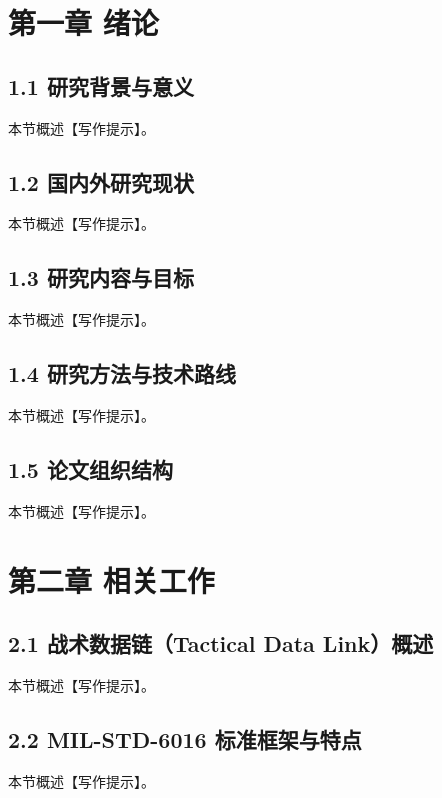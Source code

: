 
\chapter{第一章 绪论}
\section{1.1 研究背景与意义}
本节概述【写作提示】。\cite{NDIA_PMW101_2024,NDIA_PMW101_2022,DOTE_2022_MIDS_LVT,NAVAIR_MIDS_Overview,AviationWeek_SDA_LEO_2024,SDA_testing_OK_2023,MIL_STD_6016_Active_2024,L3Harris_MIDS_JTRS_2021}
\section{1.2 国内外研究现状}
本节概述【写作提示】。\cite{丁丁2019,马建强2020,程方昊2025,陈利玲2025,潘政昂2024,云超2025,wray_sheppard_1986_jtids_nav,ranger1996_jn,fried1978_taes,fried1984_navigation,doherty1988_jn,L3Harris_MIDS_LVT_2025}
\section{1.3 研究内容与目标}
本节概述【写作提示】。\cite{MITRE_Link16_Interoperability_2024,MIL_STD_6020_2017,MIL_STD_3011_2022,Collins_TTR_2021}
\section{1.4 研究方法与技术路线}
本节概述【写作提示】。\cite{SISO_STD_002_2006,CJCSI_6610_01F_2021,CJCSI_6610_01F_archive_2014,garciapena2021_navigation,musumeci_2016_nav_notch_wavelet,L3Harris_STT_KOR24A_2020}
\section{1.5 论文组织结构}
本节概述【写作提示】。\cite{Viasat_MOJO_Next_2025}

\chapter{第二章 相关工作}
\section{2.1 战术数据链（Tactical Data Link）概述}
本节概述【写作提示】。\cite{AFMAN_13_116_Vol1_2020,EverythingRF_Link16_Band,DLS_MIDS_JTRS_2021,BAE_Link16_Terminals_2025,Ultra_ADSI_2023}
\section{2.2 MIL-STD-6016 标准框架与特点}
本节概述【写作提示】。\cite{ASSIST_6016_2024,CJCSM_6235_01_2025,Ultra_MDLMS_2021}
